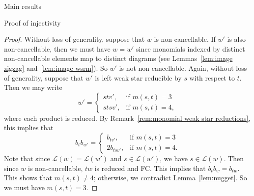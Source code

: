 \documentclass[11pt]{amsart}
\theoremstyle{definition}
\numberwithin{equation}{section}
\renewcommand{\L}{\mathcal{L}}
\renewcommand{\(}{\left(}
\renewcommand{\)}{\right)}
\begin{document}
\begin{section}{Main results}
\begin{subsection}{Proof of injectivity}
\begin{proof}
Without loss of generality, suppose that $w$ is non-cancellable.  If $w'$ is also non-cancellable, then we must have $w=w'$ since monomials indexed by distinct non-cancellable elements map to distinct diagrams (see Lemmas~\ref{lem:image zigzag} and~\ref{lem:image wsrm}).  So $w'$ is not non-cancellable.   Again, without loss of generality, suppose that $w'$ is left weak star reducible by $s$ with respect to $t$.  Then we may write 
\[
w'=\begin{cases}
stv', & \text{if } m(s,t)=3\\
stsv', & \text{if } m(s,t)=4,
\end{cases}
\]
where each product is reduced.  By Remark~\ref{rem:monomial weak star reductions}, this implies that
\[
b_{t}b_{w'}=\begin{cases}
b_{tv'}, & \text{if } m(s,t)=3\\
2b_{tsv'}, & \text{if } m(s,t)=4.
\end{cases}
\]
Note that since $\L(w)=\L(w')$ and $s \in \L(w')$, we have $s \in \L(w)$.  Then since $w$ is non-cancellable, $tw$ is reduced and FC.  This implies that $b_{t}b_{w}=b_{tw}$.  This shows that $m(s,t) \neq 4$; otherwise, we contradict Lemma~\ref{lem:nugget}.  So we must have $m(s,t)=3$.  


\end{proof}
\end{subsection}
\end{section}
\end{document}
